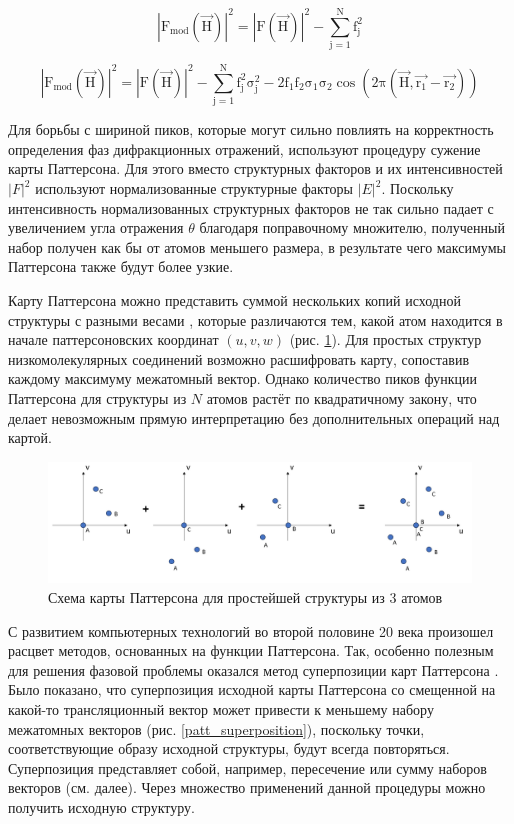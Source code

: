 \begin{equation}\label{patt_mod_1}
	\mathrm{|F_{mod}(\overrightarrow{H})|^2 = |F(\overrightarrow{H})|^2 - \sum\limits_{j=1}^Nf_j^2}
\end{equation}

\begin{equation}\label{patt_mod_2}
	\mathrm{|F_{mod}(\overrightarrow{H})|^2 = |F(\overrightarrow{H})|^2 - \sum\limits_{j=1}^Nf_j^2\sigma_j^2-2f_1f_2\sigma_1\sigma_2\cos(2\pi (\overrightarrow{H},\overrightarrow{r_1}-\overrightarrow{r_2}))}
\end{equation}

Для борьбы с шириной пиков, которые могут сильно повлиять на корректность определения фаз дифракционных отражений, используют процедуру сужение карты Паттерсона. Для этого вместо структурных факторов и их интенсивностей $|F|^2$ используют нормализованные структурные факторы $|E|^2$. Поскольку интенсивность нормализованных структурных факторов не так сильно падает с увеличением угла отражения $\theta$ благодаря поправочному множителю, полученный набор получен как бы от атомов меньшего размера, в результате чего максимумы Паттерсона также будут более узкие.

Карту Паттерсона можно представить суммой нескольких копий исходной структуры с разными весами \cite{buerger_solution_1953}, которые различаются тем, какой атом находится в начале паттерсоновских координат $(u, v, w)$ (рис. \ref{patterson_image}). Для простых структур низкомолекулярных соединений возможно расшифровать карту, сопоставив каждому максимуму межатомный вектор. Однако количество пиков функции Паттерсона для структуры из $N$ атомов растёт по квадратичному закону, что делает невозможным прямую интерпретацию без дополнительных операций над картой.

\begin{figure}[H]
	\centering
	\includegraphics[width=1\textwidth]{figures/patterson.png}\hfill
	\caption{Схема карты Паттерсона для простейшей структуры из 3 атомов}
	\label{patterson_image}
\end{figure}

С развитием компьютерных технологий во второй половине 20 века произошел расцвет методов, основанных на функции Паттерсона. Так, особенно полезным для решения фазовой проблемы оказался метод суперпозиции карт Паттерсона \cite{hendrixson_locating_1997}. Было показано, что суперпозиция исходной карты Паттерсона со смещенной на какой-то трансляционный вектор может привести к меньшему набору межатомных векторов (рис. \ref{patt_superposition}), поскольку точки, соответствующие образу исходной структуры, будут всегда повторяться. Суперпозиция представляет собой, например, пересечение или сумму наборов векторов (см. далее). Через множество применений данной процедуры можно получить исходную структуру.

